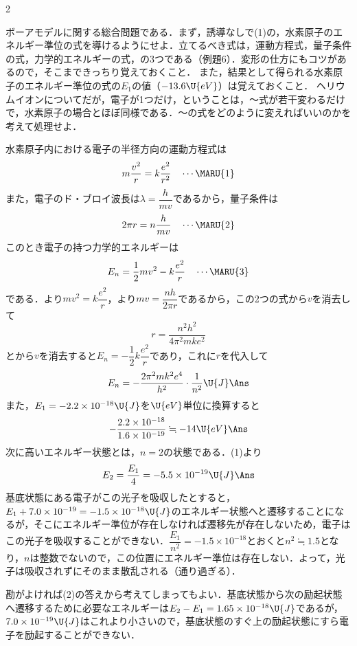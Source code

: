 \begin{multicols}{2}
\par\nopagebreak
\begin{sisin}
ボーアモデルに関する総合問題である．まず，誘導なしで(1)の，水素原子のエネルギー準位の式を導けるようにせよ．立てるべき式は，運動方程式，量子条件の式，力学的エネルギーの式，の3つである（例題6）．変形の仕方にもコツがあるので，そこまできっちり覚えておくこと．
また，結果として得られる水素原子のエネルギー準位の式の$E_1$の値（$-13.6\U{eV}$）は覚えておくこと．
ヘリウムイオンについてだが，電子が1つだけ，ということは，〜式が若干変わるだけで，水素原子の場合とほぼ同様である．〜の式をどのように変えればいいのかを考えて処理せよ．
\end{sisin}
\KaiHead
\begin{komon}
 水素原子内における電子の半径方向の運動方程式は
       \[m\frac{v^2}{r}=k\frac{e^2}{r^2}\quad\cdots\text{\MARU{1}}\]
       また，電子のド・ブロイ波長は$\lambda=\dfrac{h}{mv}$であるから，量子条件は
       \[2\pi r=n\frac{h}{mv}\quad\cdots\text{\MARU{2}}\]
       このとき電子の持つ力学的エネルギーは
       \[E_n=\frac{1}{2}mv^2-k\frac{e^2}{r}\quad\cdots\text{\MARU{3}}\]
       である．より$mv^2=k\dfrac{e^2}{r}$，より$mv=\dfrac{nh}{2\pi r}$であるから，この2つの式から$v$を消去して
       \[r=\frac{n^2h^2}{4\pi^2mke^2}\]
       とから$v$を消去すると$E_n=-\dfrac{1}{2}k\dfrac{e^2}{r}$であり，これに$r$を代入して
       \[E_n=-\frac{2\pi^2mk^2e^4}{h^2}\cdot\frac{1}{n^2}\U{J}\Ans\]
       また，$E_1=-2.2\times 10^{-18}\U{J}$を$\U{eV}$単位に換算すると
       \[-\frac{2.2\times 10^{-18}}{1.6\times 10^{-19}}\fallingdotseq -14\U{eV}\Ans\]
 次に高いエネルギー状態とは，$n=2$の状態である．(1)より
       \[E_2=\frac{E_1}{4}=-5.5\times 10^{-19}\U{J}\Ans\]
 基底状態にある電子がこの光子を吸収したとすると，$E_1+7.0\times 10^{-19}=-1.5\times 10^{-18}\U{J}$のエネルギー状態へと遷移することになるが，そこにエネルギー準位が存在しなければ遷移先が存在しないため，電子はこの光子を吸収することができない．$\dfrac{E_1}{n^2}=-1.5\times 10^{-18}$とおくと$n^2\fallingdotseq 1.5$となり，$n$は整数でないので，この位置にエネルギー準位は存在しない．よって，{\gtfamily 光子は吸収されずにそのまま散乱される（通り過ぎる）}．\Ans
       \begin{bekkai}
       勘がよければ(2)の答えから考えてしまってもよい．基底状態から次の励起状態へ遷移するために必要なエネルギーは$E_2-E_1=1.65\times 10^{-18}\U{J}$であるが，$7.0\times 10^{-19}\U{J}$はこれより小さいので，基底状態のすぐ上の励起状態にすら電子を励起することができない．

\end{bekkai}
\end{komon}
\end{multicols}
